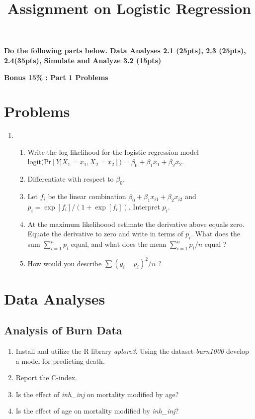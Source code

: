 \documentclass[11pt]{article}
\begin{document}
\title{Assignment on Logistic Regression }

\maketitle

\pagestyle{headings}

{\bf Do the following parts below. Data Analyses 2.1 (25pts), 2.3 (25pts), 2.4(35pts), Simulate and Analyze 3.2 (15pts)}

{\bf Bonus 15\% : Part 1 Problems}

\section{Problems}

\begin{enumerate}

\item 
\begin{enumerate}
\item Write the log likelihood for the logistic regression model \\ logit$($Pr$[Y|X_1=x_1,X_2=x_2])=\beta_0 + \beta_1 x_1 + \beta_2 x_2$.
\item Differentiate with respect to $\beta_0$.
\item Let $f_i$ be the linear combination $\beta_0 + \beta_1 x_{i1} + \beta_2 x_{i2}$ and $p_i = \exp[f_i]/(1+\exp[f_i])$. Interpret $p_i$.
\item At the maximum likelihoood estimate the derivative above equals zero. Equate the derivative to zero and write in terms of $p_i$. What does the sum $\sum_{i=1}^n p_i$ equal, and what does the mean $\sum_{i=1}^n p_i/n$ equal ?
\item How would you describe $\sum (y_i - p_i)^2/n$ ?
\end{enumerate}
\end{enumerate} 


\section{Data Analyses}


\subsection{Analysis of Burn Data}

\begin{enumerate}

\item Install and utilize the R library {\it aplore3}. Using the dataset {\it burn1000} develop a model for predicting death. 
\item Report the C-index.
\item Is the effect of {\it inh\_inj} on mortality modified by age?
\item Is the effect of age  on mortality modified by {\it inh\_inj}?

\end{enumerate}
\end{document}
